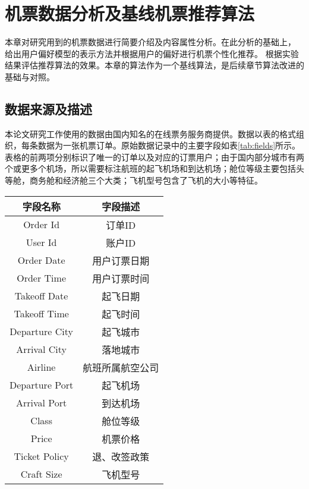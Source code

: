 
\chapter{机票数据分析及基线机票推荐算法}
\label{chap:baseline}
本章对研究用到的机票数据进行简要介绍及内容属性分析。在此分析的基础上，
给出用户偏好模型的表示方法并根据用户的偏好进行机票个性化推荐。
根据实验结果评估推荐算法的效果。本章的算法作为一个基线算法，是后续章节算法改进的基础与对照。

\section{数据来源及描述}
本论文研究工作使用的数据由国内知名的在线票务服务商提供。数据以表的格式组织，每条数据为一张机票订单。原始数据记录中的主要字段如表\ref{tab:fields}所示。
表格的前两项分别标识了唯一的订单以及对应的订票用户；由于国内部分城市有两个或更多个机场，所以需要标注航班的起飞机场和到达机场；舱位等级主要包括头等舱，商务舱和经济舱三个大类；飞机型号包含了飞机的大小等特征。

\begin{table}[!hpb]
  \centering
  \begin{tabular}{|c|c|} \hline 
    字段名称 & 字段描述\\ \hline
    Order Id & 订单ID \\ \hline
    User Id &  账户ID \\ \hline
    Order Date & 用户订票日期 \\ \hline
    Order Time & 用户订票时间 \\ \hline
    Takeoff Date & 起飞日期 \\ \hline
    Takeoff Time & 起飞时间 \\ \hline
    Departure City & 起飞城市 \\ \hline
    Arrival City & 落地城市 \\ \hline
    Airline & 航班所属航空公司 \\ \hline
    Departure Port & 起飞机场 \\ \hline
    Arrival Port & 到达机场 \\ \hline
    Class & 舱位等级 \\ \hline
    Price & 机票价格 \\ \hline
    Ticket Policy & 退、改签政策 \\ \hline
    Craft Size & 飞机型号 \\ \hline
  \end{tabular}
\end{table}

